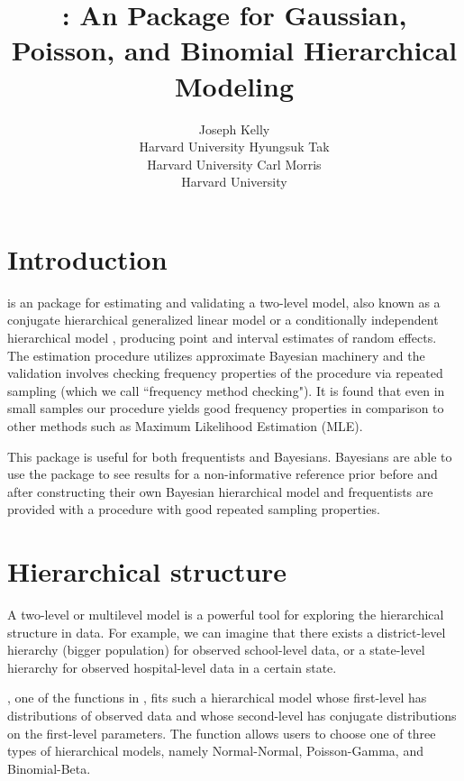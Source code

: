 \documentclass[article]{jss}
\author{Joseph Kelly\\Harvard University \And 
             Hyungsuk Tak\\Harvard University\And
             Carl Morris\\ Harvard University}
\title{\pkg{Rgbp}: An \proglang{R} Package for Gaussian, Poisson, and Binomial Hierarchical Modeling}
\begin{document}

\section[Introduction]{Introduction}
 is an  package for estimating and validating a two-level model, also known as a conjugate hierarchical generalized linear model \citep{hglm2006, hglm2010} or a conditionally independent hierarchical model \citep{1989}, producing point and interval estimates of  random effects. The estimation procedure utilizes approximate Bayesian machinery and the validation involves checking frequency properties of the procedure via repeated sampling (which we call ``frequency method checking"). It is found that even in small samples our procedure yields good frequency properties in comparison to other methods such as Maximum Likelihood Estimation (MLE). 

This package is useful for both frequentists and Bayesians. Bayesians are able to use the package to see results for a non-informative reference prior before and after constructing their own Bayesian hierarchical model and frequentists are provided with a procedure with good repeated sampling properties.

\section[Hierarchical Structure]{Hierarchical structure} \label{hierarchical}
A two-level or multilevel model is a powerful tool for exploring the hierarchical structure in data. For example, we can imagine that there exists a district-level hierarchy (bigger population) for observed school-level data, or a state-level hierarchy for observed hospital-level data in a certain state. 

, one of the functions in , fits such a hierarchical model whose first-level has distributions of observed data and whose second-level has conjugate distributions on the first-level parameters. The  function allows users to choose one of three types of hierarchical models, namely Normal-Normal, Poisson-Gamma, and Binomial-Beta. 
 
\end{document}
